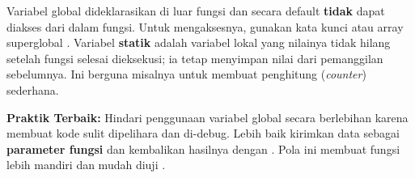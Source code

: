 Variabel global dideklarasikan di luar fungsi dan secara default \textbf{tidak} dapat diakses dari dalam fungsi. Untuk mengaksesnya, gunakan kata kunci  atau array superglobal . Variabel \textbf{statik} adalah variabel lokal yang nilainya tidak hilang setelah fungsi selesai dieksekusi; ia tetap menyimpan nilai dari pemanggilan sebelumnya. Ini berguna misalnya untuk membuat penghitung (\textit{counter}) sederhana.


\begin{konsep}
\textbf{Praktik Terbaik:} Hindari penggunaan variabel global secara berlebihan karena membuat kode sulit dipelihara dan di-debug. Lebih baik kirimkan data sebagai \textbf{parameter fungsi} dan kembalikan hasilnya dengan . Pola ini membuat fungsi lebih mandiri dan mudah diuji \cite{phpRightWay}.
\end{konsep}

